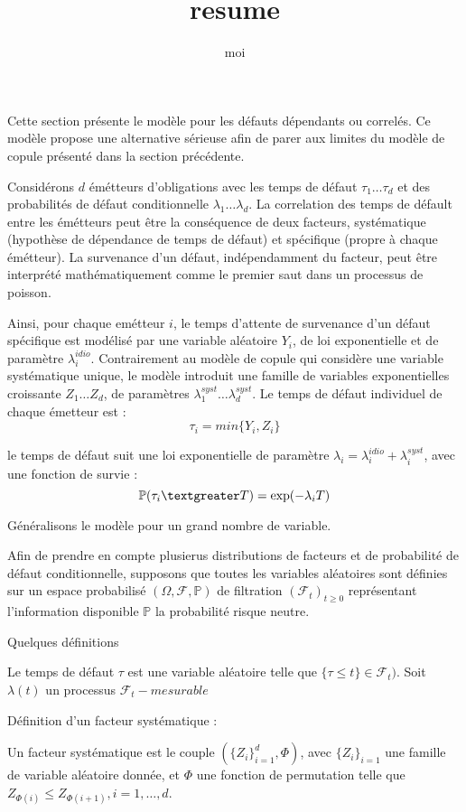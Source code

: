 \documentclass[10pt,a4paper]{article}
\author{moi}
\title{resume}
\begin{document}
	
	Cette section présente le modèle pour les défauts dépendants ou correlés. Ce modèle propose une alternative sérieuse afin de parer aux limites du modèle de copule présenté dans la section précédente.
	
	Considérons $d$  émétteurs d'obligations avec les temps de défaut $ \tau_1 \ldots \tau_d $ et des probabilités de défaut conditionnelle $ \lambda_1 \ldots \lambda_d $. La correlation des temps de défault  entre les émétteurs peut être la conséquence de deux facteurs, systématique (hypothèse de dépendance de temps de défaut) et spécifique (propre à chaque émétteur). La survenance d'un défaut, indépendamment du facteur, peut être interprété mathématiquement comme le premier saut dans un processus de poisson.
	
	Ainsi, pour chaque emétteur $ i $, le temps d'attente de survenance d'un défaut spécifique est modélisé par une variable aléatoire $ Y_i $, de loi exponentielle et de paramètre $ \lambda_i^{idio} $. Contrairement au modèle de copule qui considère une variable systématique unique, le modèle introduit une famille de variables exponentielles croissante $ Z_1 \ldots Z_d $, de paramètres $ \lambda_1^{syst} \ldots \lambda_d^{syst} $. Le temps de défaut individuel de chaque émetteur est : 
	$$ \tau_i = min\{ Y_i, Z_i\} $$
	
	le temps de défaut suit une loi exponentielle de paramètre $ \lambda_i = \lambda_i^{idio} + \lambda_i^{syst}  $, avec une fonction de survie :
	$$\mathbb{P}( \tau_i \textgreater T) = \exp(-\lambda_i T) $$
	
	Généralisons le modèle pour un grand nombre de variable.
	
	Afin de prendre en compte plusierus distributions de facteurs et de probabilité de défaut conditionnelle, supposons que toutes les variables aléatoires sont définies sur un espace probabilisé $ (\Omega,\mathcal{F},\mathbb{P}) $ de filtration   $ (\mathcal{F}_t)_{t\geq0} $ représentant l'information disponible $ \mathbb{P} $ la probabilité risque neutre.
	
	Quelques définitions
	
	Le temps de défaut $ \tau $ est une variable aléatoire telle que $ \{ \tau \leq t\} \in \mathcal{F}_t)$.
	Soit $ \lambda(t) $  un processus $ \mathcal{F}_t-mesurable $
	
	Définition d'un facteur systématique :
	
	Un facteur systématique est le couple $ (\{ Z_i\}_{i=1}^{d}, \varPhi ) $, avec $ \{ Z_i\}_{i=1} $ une famille de variable aléatoire donnée, et $ \varPhi $ une fonction de permutation telle que 
	$  Z_{\varPhi(i)} \leq Z_{\varPhi(i+1)}, i=1,\ldots,d $.
	
\end{document}
